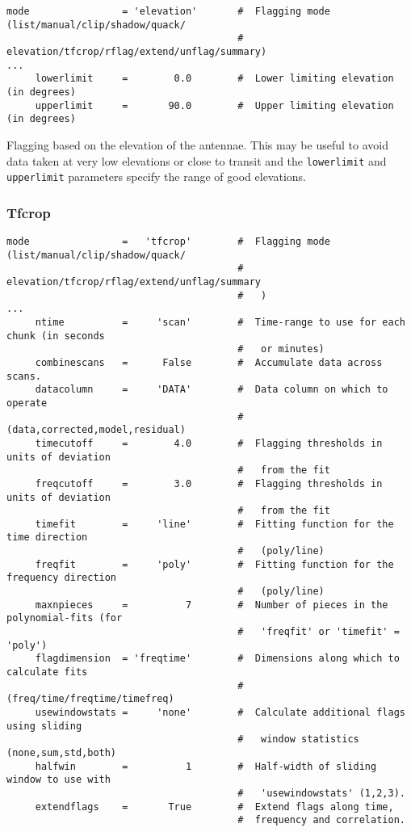 \small
\begin{verbatim}
mode                = 'elevation'       #  Flagging mode (list/manual/clip/shadow/quack/
                                        #   elevation/tfcrop/rflag/extend/unflag/summary)
...
     lowerlimit     =        0.0        #  Lower limiting elevation (in degrees)
     upperlimit     =       90.0        #  Upper limiting elevation (in degrees)
\end{verbatim}
\normalsize

Flagging based on the elevation of the antennae. This may be useful to
avoid data taken at very low elevations or close to transit and the
{\tt lowerlimit} and {\tt upperlimit} parameters specify the range of
good elevations.


\subsubsection{Tfcrop}
\label{section:edit.flagdata.mode.tfcrop}

\small
\begin{verbatim}
mode                =   'tfcrop'        #  Flagging mode (list/manual/clip/shadow/quack/
                                        #   elevation/tfcrop/rflag/extend/unflag/summary
                                        #   )
...
     ntime          =     'scan'        #  Time-range to use for each chunk (in seconds
                                        #   or minutes)
     combinescans   =      False        #  Accumulate data across scans.
     datacolumn     =     'DATA'        #  Data column on which to operate
                                        #   (data,corrected,model,residual)
     timecutoff     =        4.0        #  Flagging thresholds in units of deviation
                                        #   from the fit
     freqcutoff     =        3.0        #  Flagging thresholds in units of deviation
                                        #   from the fit
     timefit        =     'line'        #  Fitting function for the time direction
                                        #   (poly/line)
     freqfit        =     'poly'        #  Fitting function for the frequency direction
                                        #   (poly/line)
     maxnpieces     =          7        #  Number of pieces in the polynomial-fits (for
                                        #   'freqfit' or 'timefit' = 'poly')
     flagdimension  = 'freqtime'        #  Dimensions along which to calculate fits
                                        #   (freq/time/freqtime/timefreq)
     usewindowstats =     'none'        #  Calculate additional flags using sliding
                                        #   window statistics (none,sum,std,both)
     halfwin        =          1        #  Half-width of sliding window to use with
                                        #   'usewindowstats' (1,2,3).
     extendflags    =       True        #  Extend flags along time,
                                        #  frequency and correlation.

\end{verbatim}
\normalsize

